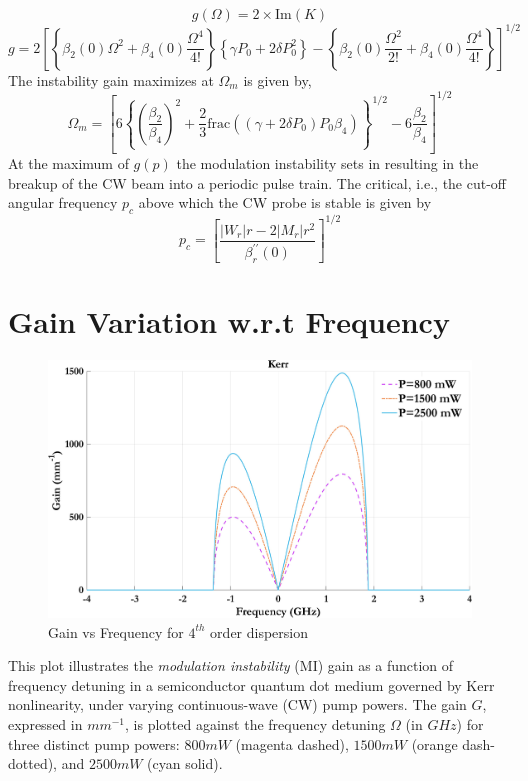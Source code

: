 \documentclass[12pt,a4paper]{article}
\begin{document}
\begin{equation}
g(\Omega) = 2 \times \text{Im}(K)
\end{equation}
\begin{equation}
g = 2 \left[ \left\{ \beta_2(0) \Omega^2 + \beta_4(0) \frac{\Omega^4}{4!} \right\} \left\{ \gamma P_0 + 2 \delta P_0^2 \right\} - \left\{ \beta_2(0) \frac{\Omega^2}{2!} + \beta_4(0) \frac{\Omega^4}{4!} \right\} \right]^{1/2}
\end{equation}
The instability gain maximizes at $\Omega_m$ is given by,
\begin{equation}
\Omega_m = \left[ 6 \left\{ \left( \frac{\beta_2}{\beta_4} \right)^2 + \frac{2}{3} \text{frac} \left( (\gamma + 2\delta P_0) P_0 \beta_4 \right) \right\}^{1/2} - 6 \frac{\beta_2}{\beta_4} \right]^{1/2}
\end{equation}
At the maximum of \(g(p)\) the modulation instability sets in resulting in the breakup of the CW beam into a periodic pulse train. The critical, i.e., the cut-off angular frequency \(p_c\) above which the CW probe is stable is given by
\begin{equation}
p_c = \left[ \frac{|W_r|r - 2|M_r|r^2}{\beta^{\prime\prime}_r(0)} \right]^{1/2}
\end{equation}
\vspace{0pt}

\section{Gain Variation w.r.t Frequency}

\begin{figure}[h]
    \centering
    \includegraphics[width=0.7\linewidth]{Plots/G_v_Power.jpeg}
    \caption{Gain vs Frequency for $4^{th}$ order dispersion}
    \label{fig:G_v_P}
\end{figure}
This plot illustrates the \textit{modulation instability} \cite{lighthall} (MI) gain as a function of frequency detuning in a semiconductor quantum dot medium governed by Kerr nonlinearity, under varying continuous-wave (CW) pump powers. The gain \( G \), expressed in ${mm^{-1}}$, is plotted against the frequency detuning \( \Omega \) (in ${GHz}$) for three distinct pump powers: ${800}{mW}$ (magenta dashed), ${1500}{mW}$ (orange dash-dotted), and ${2500}{mW}$ (cyan solid).
\end{document}
